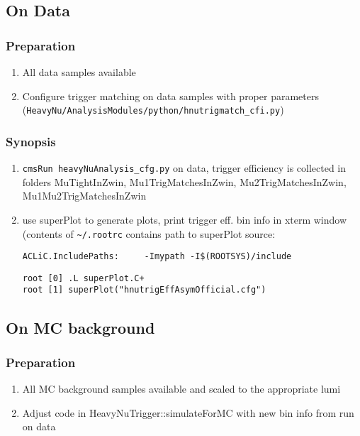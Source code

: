 \documentclass[english]{article}
\begin{document}
\subsection{On Data}
\subsubsection{Preparation}
\begin{enumerate}
\item All data samples available
\item Configure trigger matching on data samples with proper parameters \\
 (\verb#HeavyNu/AnalysisModules/python/hnutrigmatch_cfi.py#)
\end{enumerate}

\subsubsection{Synopsis}
\begin{enumerate}
%
\item \verb#cmsRun heavyNuAnalysis_cfg.py# on data, trigger efficiency is collected in folders
MuTightInZwin, Mu1TrigMatchesInZwin, Mu2TrigMatchesInZwin, Mu1Mu2TrigMatchesInZwin
%
\item use superPlot to generate plots, print trigger eff. bin info in xterm window
(contents of \verb#~/.rootrc# contains path to superPlot source:
\begin{lstlisting}
ACLiC.IncludePaths:     -Imypath -I$(ROOTSYS)/include
\end{lstlisting}
\begin{lstlisting}
root [0] .L superPlot.C+
root [1] superPlot("hnutrigEffAsymOfficial.cfg")
\end{lstlisting}
%
\end{enumerate}

\subsection{On MC background}
\subsubsection{Preparation}
\begin{enumerate}
%
\item All MC background samples available and scaled to the appropriate lumi
%
\item Adjust code in HeavyNuTrigger::simulateForMC with new bin info from run on data
\end{enumerate}
\end{document}
